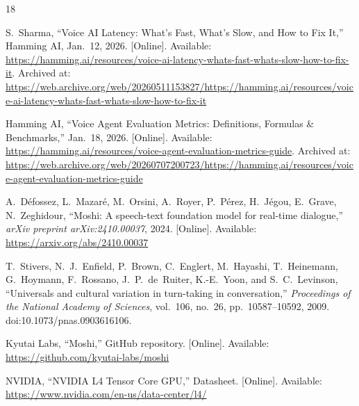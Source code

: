 \documentclass[journal]{IEEEtran}
\begin{document}
%
%
%
\begin{thebibliography}{18}

S.~Sharma, ``Voice AI Latency: What's Fast, What's Slow, and How to Fix It,'' Hamming AI, Jan.~12, 2026. [Online]. Available: \url{https://hamming.ai/resources/voice-ai-latency-whats-fast-whats-slow-how-to-fix-it}. Archived at: \url{https://web.archive.org/web/20260511153827/https://hamming.ai/resources/voice-ai-latency-whats-fast-whats-slow-how-to-fix-it}

Hamming AI, ``Voice Agent Evaluation Metrics: Definitions, Formulas \& Benchmarks,'' Jan.~18, 2026. [Online]. Available: \url{https://hamming.ai/resources/voice-agent-evaluation-metrics-guide}. Archived at: \url{https://web.archive.org/web/20260707200723/https://hamming.ai/resources/voice-agent-evaluation-metrics-guide}

A.~Défossez, L.~Mazaré, M.~Orsini, A.~Royer, P.~Pérez, H.~Jégou, E.~Grave, N.~Zeghidour, ``Moshi: A speech-text foundation model for real-time dialogue,'' \emph{arXiv preprint arXiv:2410.00037}, 2024. [Online]. Available: \url{https://arxiv.org/abs/2410.00037}

T.~Stivers, N.~J.~Enfield, P.~Brown, C.~Englert, M.~Hayashi, T.~Heinemann, G.~Hoymann, F.~Rossano, J.~P.~de~Ruiter, K.-E.~Yoon, and S.~C.~Levinson, ``Universals and cultural variation in turn-taking in conversation,'' \emph{Proceedings of the National Academy of Sciences}, vol.~106, no.~26, pp.~10587--10592, 2009. doi:10.1073/pnas.0903616106.

Kyutai Labs, ``Moshi,'' GitHub repository. [Online]. Available: \url{https://github.com/kyutai-labs/moshi}

NVIDIA, ``NVIDIA L4 Tensor Core GPU,'' Datasheet. [Online]. Available: \url{https://www.nvidia.com/en-us/data-center/l4/}


\end{thebibliography}
\end{document}
